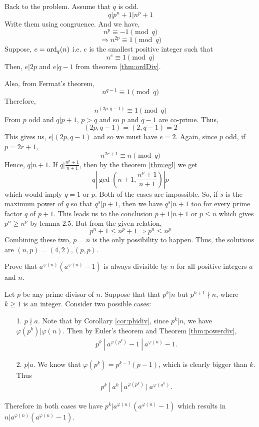 \documentclass[problems.tex]{subfile}
\begin{document}
\begin{solution}
		Back to the problem.
		Assume that $q$ is odd. \[q|p^n+1|n^p+1\]
		Write them using congruence. And we have, \[n^p\equiv-1\pmod q\]
		\[\Rightarrow n^{2p}\equiv1\pmod q\]
		Suppose, $e=\operatorname{ord}_q(n)$ i.e. $e$ is the smallest positive integer such that \[n^e\equiv1\pmod q\]
		Then, $e|2p$ and $e|q-1$ from theorem \eqref{thm:ordDiv}.
		
		Also, from Fermat's theorem, \[n^{q-1}\equiv1\pmod q\]
		Therefore, \[n^{(2p,q-1)}\equiv1\pmod q\]
		From $p$ odd and $q|p+1$, $p>q$ and so $p$ and $q-1$ are co-prime. Thus, \[(2p,q-1)=(2,q-1)=2\] 
		This gives us, $e|(2p,q-1)$ and so we must have $e=2$. Again, since $p$ odd, if $p=2r+1$, \[n^{2r+1}\equiv n\pmod q\]
		Hence, $q|n+1$. If $q|\frac{n^p+1}{n+1}$, then by the theorem \eqref{thm:egl} we get \[q|\gcd\left(n+1,\frac{n^p+1}{n+1}\right)|p\]
		which would imply $q=1$ or $p$. Both of the cases are impossible. So, if $s$ is the maximum power of $q$ so that $q^s|p+1$, then we have $q^s|n+1$ too for every prime factor $q$ of $p+1$. This leads us to the conclusion $p+1|n+1$ or $p\le n$ which gives $p^n\ge n^p$ by lemma 2.5. But from the given relation, \[p^n+1\le n^p+1\Rightarrow p^n\le n^p\]
		Combining these two, $p=n$ is the only possibility to happen. Thus, the solutions are $(n, p)=(4,2),(p, p)$.
	\end{solution}
	
	\begin{problem}
		Prove that $a^{\varphi(n)}(a^{\varphi(n)}-1)$ is always divisible by $n$ for all positive integers $a$ and $n$.
	\end{problem}
	
	\begin{solution}
		Let $p$ be any prime divisor of $n$. Suppose that that $p^k | n$ but $p^{k+1} \nmid n$, where $k\geq 1$ is an integer. Consider two possible cases:
		\begin{itemize}
			\item[1.] $p \nmid a$.  Note that by Corollary \eqref{cor:phidiv}, since $p^k | n$, we have $\varphi(p^k) |‌\varphi(n)$. Then by Euler's theorem and Theorem \eqref{thm:powerdiv},
				\begin{align*}
					p^k \ | \ a^{\varphi(p^k)} -1 \ | \ a^{\varphi(n)} -1.
				\end{align*}
			\item[2.] 	$p|a$. We know that $\varphi(p^k)=p^{k-1}(p-1)$, which is clearly bigger than $k$. Thus
				\begin{align*}
					p^k \ | \ a^k \ |\ a^{\varphi(p^k)} \ | \ a^{\varphi(a^n)}.
				\end{align*}
		\end{itemize}
		\noindent Therefore in both cases we have $p^k | a^{\varphi(n)}(a^{\varphi(n)}-1)$ which results in $n|a^{\varphi(n)}(a^{\varphi(n)}-1)$.
	\end{solution}
	
\end{document}
